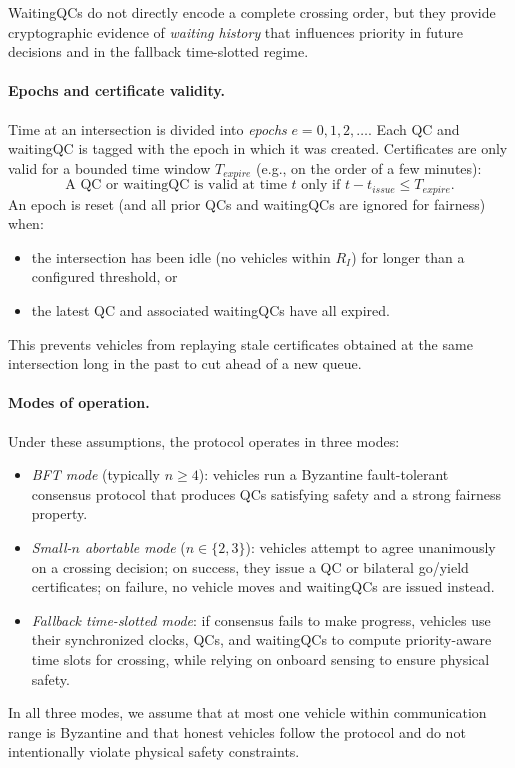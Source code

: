 \documentclass[fleqn,10pt]{olplainarticle}
\begin{document}
WaitingQCs do not directly encode a complete crossing order, but they provide cryptographic evidence of \emph{waiting history} that influences priority in future decisions and in the fallback time-slotted regime.

\paragraph{Epochs and certificate validity.}
Time at an intersection is divided into \emph{epochs} $e = 0,1,2,\dots$. Each QC and waitingQC is tagged with the epoch in which it was created. Certificates are only valid for a bounded time window $T_{\mathit{expire}}$ (e.g., on the order of a few minutes):
\[
  \text{A QC or waitingQC is valid at time } t \text{ only if } t - t_{\mathit{issue}} \le T_{\mathit{expire}}.
\]
An epoch is reset (and all prior QCs and waitingQCs are ignored for fairness) when:
\begin{itemize}
  \item the intersection has been idle (no vehicles within $R_I$) for longer than a configured threshold, or
  \item the latest QC and associated waitingQCs have all expired.
\end{itemize}
This prevents vehicles from replaying stale certificates obtained at the same intersection long in the past to cut ahead of a new queue.

\paragraph{Modes of operation.}
Under these assumptions, the protocol operates in three modes:
\begin{itemize}
  \item \emph{BFT mode} (typically $n \ge 4$): vehicles run a Byzantine fault-tolerant consensus protocol that produces QCs satisfying safety and a strong fairness property.
  \item \emph{Small-$n$ abortable mode} ($n \in \{2,3\}$): vehicles attempt to agree unanimously on a crossing decision; on success, they issue a QC or bilateral go/yield certificates; on failure, no vehicle moves and waitingQCs are issued instead.
  \item \emph{Fallback time-slotted mode}: if consensus fails to make progress, vehicles use their synchronized clocks, QCs, and waitingQCs to compute priority-aware time slots for crossing, while relying on onboard sensing to ensure physical safety.
\end{itemize}
In all three modes, we assume that at most one vehicle within communication range is Byzantine and that honest vehicles follow the protocol and do not intentionally violate physical safety constraints.
\end{document}
